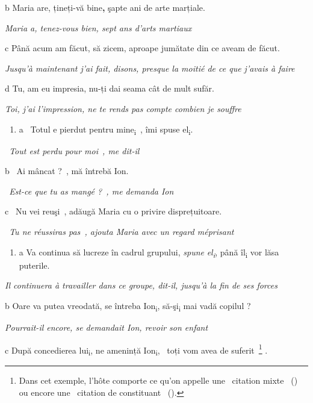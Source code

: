   b  Maria are, țineți-vă bine\textbf{,} şapte ani de arte marțiale.

{\itshape
Maria a, tenez-vous bien, sept ans d'arts martiaux}

  c  Până acum am făcut, să zicem, aproape jumătate din ce aveam de făcut.

{\itshape
Jusqu'à maintenant j'ai fait, disons, presque la moitié de ce que j'avais à faire}

  d  Tu, am eu impresia, nu-ți dai seama cât de mult sufăr.

{\itshape
Toi, j'ai l'impression, ne te rends pas compte combien je souffre}


\begin{enumerate}
\item \label{bkm:Ref275288301}a  {\guillemotleft}~Totul e pierdut pentru mine\textsubscript{i}~{\guillemotright}, îmi spuse el\textsubscript{i}.


\end{enumerate}
{\itshape
{\guillemotleft}~Tout est perdu pour moi~{\guillemotright}, me dit-il}

  b  {\guillemotleft}~Ai mâncat ?~{\guillemotright}, mă întrebă Ion.

{\itshape
{\guillemotleft}~Est-ce que tu as mangé ?~{\guillemotright}, me demanda Ion}

  c  {\guillemotleft}~Nu vei reuşi~{\guillemotright}, adăugă Maria cu o privire disprețuitoare.

{\itshape
{\guillemotleft}~Tu ne réussiras pas~{\guillemotright}, ajouta Maria avec un regard méprisant}


\begin{enumerate}
\item \label{bkm:Ref275288287}a  Va continua să lucreze în cadrul grupului, \emph{\textup{spune}}\emph{} \emph{\textup{el}}\emph{\textup{\textsubscript{i}}}, până îl\textsubscript{i} vor lăsa puterile.


\end{enumerate}
{\itshape
Il continuera à travailler dans ce groupe, dit-il, jusqu'à la fin de ses forces}

  b  Oare va putea vreodată, se întreba Ion\textsubscript{i}, să-şi\textsubscript{i} mai vadă copilul ?

{\itshape
Pourrait-il encore, se demandait Ion, revoir son enfant}

  c  După concedierea lui\textsubscript{i}, ne amenință Ion\textsubscript{i}, {\guillemotleft}~toți vom avea de suferit~{\guillemotright}\footnote{Dans cet exemple, l'hôte comporte ce qu'on appelle une {\guillemotleft}~citation mixte~{\guillemotright} (\citet{Davidson1979}) ou encore une {\guillemotleft}~citation de constituant~{\guillemotright} (\citet{Potts2007}).} .

